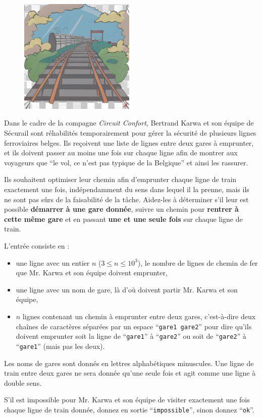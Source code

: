 \problemname{\problemyamlname}

\begin{figure}
    \centering
    \includegraphics[width=5.5cm]{railway.jpg}
\end{figure}
Dans le cadre de la compagne \emph{Circuit Confort}, Bertrand Karwa et son équipe de Sécurail sont réhabilités
temporairement pour gérer la sécurité de plusieurs lignes ferroviaires belges. Ils reçoivent une liste de lignes
entre deux gares à emprunter, et ils doivent passer au moins une fois sur chaque ligne afin de montrer aux
voyageurs que ``le vol, ce n'est pas typique de la Belgique'' et ainsi les rassurer.

Ils souhaitent optimiser leur chemin afin d'emprunter chaque ligne de train exactement une fois, indépendamment du sens dans lequel il la prenne, mais ils ne sont pas sûrs
de la faisabilité de la tâche. Aidez-les à déterminer s'il leur est possible \textbf{démarrer à une gare donnée}, suivre un chemin pour \textbf{rentrer à cette même gare} et en passant \textbf{une et une seule fois} sur chaque ligne de train.

\begin{Input}
    L'entrée consiste en :
    \begin{itemize}
        \item une ligne avec un entier $n$ ($3 \le n \le 10^3$), le nombre de lignes de chemin de fer que Mr. Karwa et son équipe doivent emprunter,
        \item une ligne avec un nom de gare, là d'où doivent partir Mr. Karwa et son équipe,
        \item $n$ lignes contenant un chemin à emprunter entre deux gares, c'est-à-dire deux chaînes de caractères séparées par un espace ``\verb|gare1 gare2|'' pour dire qu'ils doivent emprunter soit la ligne de ``\verb|gare1|'' à ``\verb|gare2|'' ou soit de ``\verb|gare2|'' à ``\verb|gare1|'' (mais pas les deux).
    \end{itemize}
    Les noms de gares sont donnés en lettres alphabétiques minuscules.
    Une ligne de train entre deux gares ne sera donnée qu'une seule fois et agit comme une ligne à double sens.
\end{Input}

\begin{Output}
    S'il est impossible pour Mr. Karwa et son équipe de visiter exactement une fois chaque ligne de train donnée, donnez en sortie ``\verb|impossible|'', sinon donnez ``\verb|ok|''.
\end{Output}
